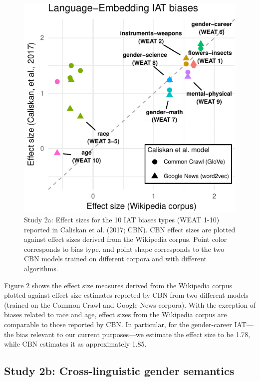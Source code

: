 \documentclass[10pt, letterpaper]{article}
\newenvironment{CodeChunk}{}{}
\begin{document}
\begin{CodeChunk}
\begin{figure}[t]

{\centering \includegraphics{figs/WEAT_plot-1} 

}

\caption[Study 2a]{Study 2a: Effect sizes for the 10 IAT biases types (WEAT 1-10) reported in Caliskan et al. (2017; CBN). CBN effect sizes  are plotted against effect sizes derived from the Wikipedia corpus.  Point color corresponds to  bias type, and point shape corresponds to the two CBN models trained on different corpora and with different algorithms.}\label{fig:WEAT_plot}
\end{figure}
\end{CodeChunk}

Figure 2 shows the effect size measures derived from the Wikipedia
corpus plotted against effect size estimates reported by CBN from two
different models (trained on the Common Crawl and Google News corpora).
With the exception of biases related to race and age, effect sizes from
the Wikipedia corpus are comparable to those reported by CBN. In
particular, for the gender-career IAT---the bias relevant to our current
purposes---we estimate the effect size to be 1.78, while CBN estimates
it as approximately 1.85.

\subsection{Study 2b: Cross-linguistic gender
semantics}\label{study-2b-cross-linguistic-gender-semantics}
\end{document}
